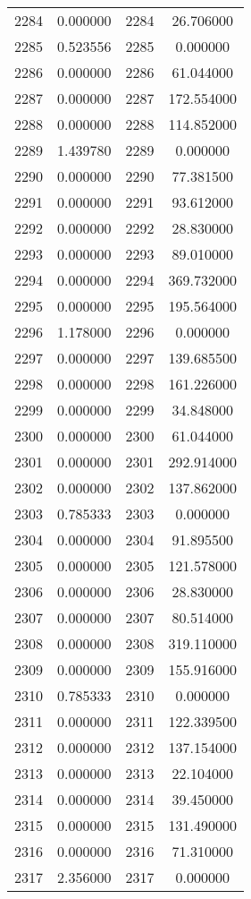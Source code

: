 \documentclass[12pt]{article}
\begin{document}
\begin{longtable}{@{}cccc@{}}
2284 & 0.000000 & 2284 & 26.706000 \\
2285 & 0.523556 & 2285 & 0.000000 \\
2286 & 0.000000 & 2286 & 61.044000 \\
2287 & 0.000000 & 2287 & 172.554000 \\
2288 & 0.000000 & 2288 & 114.852000 \\
2289 & 1.439780 & 2289 & 0.000000 \\
2290 & 0.000000 & 2290 & 77.381500 \\
2291 & 0.000000 & 2291 & 93.612000 \\
2292 & 0.000000 & 2292 & 28.830000 \\
2293 & 0.000000 & 2293 & 89.010000 \\
2294 & 0.000000 & 2294 & 369.732000 \\
2295 & 0.000000 & 2295 & 195.564000 \\
2296 & 1.178000 & 2296 & 0.000000 \\
2297 & 0.000000 & 2297 & 139.685500 \\
2298 & 0.000000 & 2298 & 161.226000 \\
2299 & 0.000000 & 2299 & 34.848000 \\
2300 & 0.000000 & 2300 & 61.044000 \\
2301 & 0.000000 & 2301 & 292.914000 \\
2302 & 0.000000 & 2302 & 137.862000 \\
2303 & 0.785333 & 2303 & 0.000000 \\
2304 & 0.000000 & 2304 & 91.895500 \\
2305 & 0.000000 & 2305 & 121.578000 \\
2306 & 0.000000 & 2306 & 28.830000 \\
2307 & 0.000000 & 2307 & 80.514000 \\
2308 & 0.000000 & 2308 & 319.110000 \\
2309 & 0.000000 & 2309 & 155.916000 \\
2310 & 0.785333 & 2310 & 0.000000 \\
2311 & 0.000000 & 2311 & 122.339500 \\
2312 & 0.000000 & 2312 & 137.154000 \\
2313 & 0.000000 & 2313 & 22.104000 \\
2314 & 0.000000 & 2314 & 39.450000 \\
2315 & 0.000000 & 2315 & 131.490000 \\
2316 & 0.000000 & 2316 & 71.310000 \\
2317 & 2.356000 & 2317 & 0.000000 \\

\end{longtable}
\end{document}
